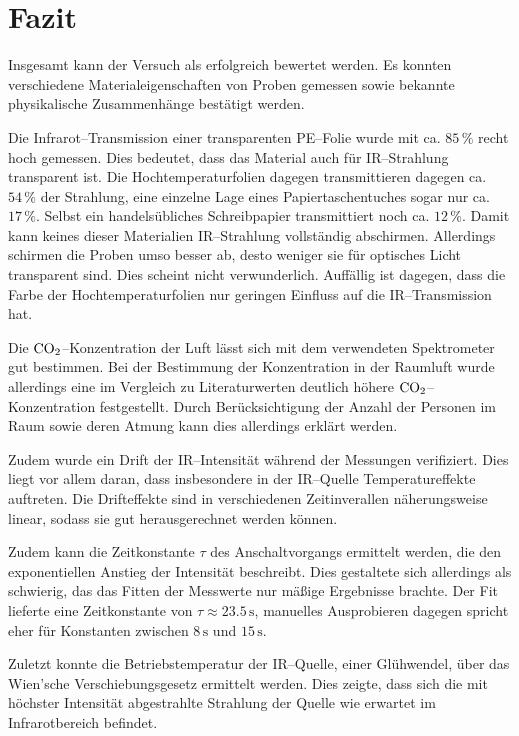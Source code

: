 \documentclass[12pt,a4paper]{scrartcl}
\numberwithin{equation}{section} %
\begin{document}
	\clearpage
	\hypertarget{fazit}{%
		\section{Fazit}\label{fazit}}
	Insgesamt kann der Versuch als erfolgreich bewertet werden. Es konnten verschiedene Materialeigenschaften von Proben gemessen sowie bekannte physikalische Zusammenhänge bestätigt werden.
	
	Die Infrarot--Transmission einer transparenten PE--Folie wurde mit ca. $85\,\%$ recht hoch gemessen. Dies bedeutet, dass das Material auch für IR--Strahlung transparent ist. Die Hochtemperaturfolien dagegen transmittieren dagegen ca. $54\,\%$ der Strahlung, eine einzelne Lage eines Papiertaschentuches sogar nur ca. $17\,\%$. Selbst ein handelsübliches Schreibpapier transmittiert noch ca. $12\,\%$. Damit kann keines dieser Materialien IR--Strahlung vollständig abschirmen. Allerdings schirmen die Proben umso besser ab, desto weniger sie für optisches Licht transparent sind. Dies scheint nicht verwunderlich. Auffällig ist dagegen, dass die Farbe der Hochtemperaturfolien nur geringen Einfluss auf die IR--Transmission hat.
	
	Die $\ce{CO_2}$--Konzentration der Luft lässt sich mit dem verwendeten Spektrometer gut bestimmen. Bei der Bestimmung der Konzentration in der Raumluft wurde allerdings eine im Vergleich zu Literaturwerten deutlich höhere $\ce{CO_2}$--Konzentration festgestellt. Durch Berücksichtigung der Anzahl der Personen im Raum sowie deren Atmung kann dies allerdings erklärt werden.
	
	Zudem wurde ein Drift der IR--Intensität während der Messungen verifiziert. Dies liegt vor allem daran, dass insbesondere in der IR--Quelle Temperatureffekte auftreten. Die Drifteffekte sind in verschiedenen Zeitinverallen näherungsweise linear, sodass sie gut herausgerechnet werden können.
	
	Zudem kann die Zeitkonstante $\tau$ des Anschaltvorgangs ermittelt werden, die den exponentiellen Anstieg der Intensität beschreibt. Dies gestaltete sich allerdings als schwierig, das das Fitten der Messwerte nur mäßige Ergebnisse brachte. Der Fit lieferte eine Zeitkonstante von $\tau\approx23.5\mathrm{\,s}$, manuelles Ausprobieren dagegen spricht eher für Konstanten zwischen $8\mathrm{\,s}$ und $15\mathrm{\,s}$.
	
	Zuletzt konnte die Betriebstemperatur der IR--Quelle, einer Glühwendel, über das Wien'sche Verschiebungsgesetz ermittelt werden. Dies zeigte, dass sich die mit höchster Intensität abgestrahlte Strahlung der Quelle wie erwartet im Infrarotbereich befindet.
	
\end{document}
